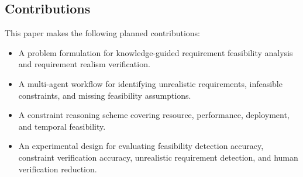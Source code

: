 \subsection{Contributions}
\label{intro:contributions}

This paper makes the following planned contributions:
\begin{itemize}[leftmargin=*]
  \item A problem formulation for knowledge-guided requirement feasibility analysis and requirement realism verification.
  \item A multi-agent workflow for identifying unrealistic requirements, infeasible constraints, and missing feasibility assumptions.
  \item A constraint reasoning scheme covering resource, performance, deployment, and temporal feasibility.
  \item An experimental design for evaluating feasibility detection accuracy, constraint verification accuracy, unrealistic requirement detection, and human verification reduction.
\end{itemize}
